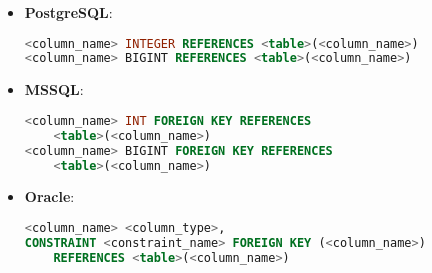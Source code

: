 \begin{itemize}
    \item \textbf{PostgreSQL}:
    \begin{lstlisting}[language=sql]
<column_name> INTEGER REFERENCES <table>(<column_name>)
<column_name> BIGINT REFERENCES <table>(<column_name>)
    \end{lstlisting}

    \item \textbf{MSSQL}:
    \begin{lstlisting}[language=sql]
<column_name> INT FOREIGN KEY REFERENCES 
    <table>(<column_name>)
<column_name> BIGINT FOREIGN KEY REFERENCES 
    <table>(<column_name>)
    \end{lstlisting}

    \item \textbf{Oracle}:
    \begin{lstlisting}[language=sql]
<column_name> <column_type>,
CONSTRAINT <constraint_name> FOREIGN KEY (<column_name>) 
    REFERENCES <table>(<column_name>)
    \end{lstlisting}
\end{itemize}